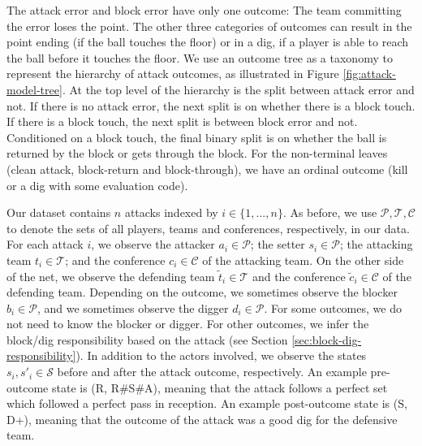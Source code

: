 \documentclass[USenglish]{article}
\theoremstyle{dgthm}
\theoremstyle{dgdef}
\begin{document}
The attack error and block error have only one outcome: The team committing the error loses the point. The other three categories of outcomes can result in the point ending (if the ball touches the floor) or in a dig, if a player is able to reach the ball before it touches the floor. We use an outcome tree as a taxonomy to represent the hierarchy of attack outcomes, as illustrated in Figure \ref{fig:attack-model-tree}. At the top level of the hierarchy is the split between attack error and not. If there is no attack error, the next split is on whether there is a block touch. If there is a block touch, the next split is between block error and not. Conditioned on a block touch, the final binary split is on whether the ball is returned by the block or gets through the block. For the non-terminal leaves (clean attack, block-return and block-through), we have an ordinal outcome (kill or a dig with some evaluation code).

Our dataset contains $n$ attacks indexed by $i \in \{1, ..., n\}$. As before, we use $\mathcal{P}, \mathcal{T}, \mathcal{C}$ to denote the sets of all players, teams and conferences, respectively, in our data. For each attack $i$, we observe the attacker $a_i \in \mathcal{P}$; the setter $s_i \in \mathcal{P}$; the attacking team $t_i \in \mathcal{T}$; and the conference $c_i \in \mathcal{C}$ of the attacking team. On the other side of the net, we observe the defending team $\tilde t_i \in \mathcal{T}$ and the conference $\tilde c_i \in \mathcal C$ of the defending team. Depending on the outcome, we sometimes observe the blocker $b_i \in \mathcal{P}$, and we sometimes observe the digger $d_i \in \mathcal{P}$. For some outcomes, we do not need to know the blocker or digger. For other outcomes, we infer the block/dig responsibility based on the attack (see Section \ref{sec:block-dig-responsibility}). In addition to the actors involved, we observe the states $s_i, s'_i \in \mathcal{S}$ before and after the attack outcome, respectively. An example pre-outcome state is (R, R\#S\#A), meaning that the attack follows a perfect set which followed a perfect pass in reception. An example post-outcome state is (S, D+), meaning that the outcome of the attack was a good dig for the defensive team.
\end{document}
